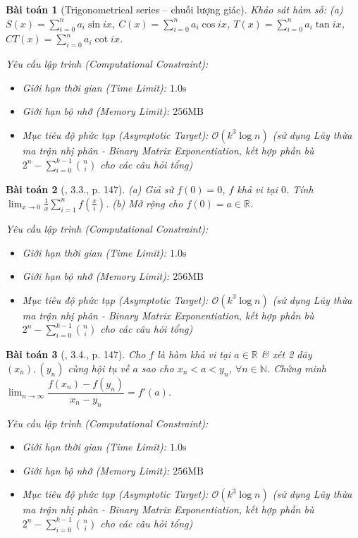 \documentclass{article}
\newtheorem{baitoan}{Bài toán}
\begin{document}
\begin{baitoan}[Trigonometrical series -- chuỗi lượng giác]
	Khảo sát hàm số: (a) $S(x) = \sum_{i=0}^n a_i\sin ix$, $C(x) = \sum_{i=0}^n a_i\cos ix$, $T(x) = \sum_{i=0}^n a_i\tan ix$, $CT(x) = \sum_{i=0}^n a_i\cot ix$.

    \vspace{0.5em}
    \emph{Yêu cầu lập trình (Computational Constraint):}
    \begin{itemize}
        \item Giới hạn thời gian (Time Limit): $1.0\mathrm{s}$
        \item Giới hạn bộ nhớ (Memory Limit): $256\mathrm{MB}$
        \item Mục tiêu độ phức tạp (Asymptotic Target): $\mathcal{O}(k^3 \log n)$ (sử dụng Lũy thừa ma trận nhị phân - Binary Matrix Exponentiation, kết hợp phần bù $2^n - \sum_{i=0}^{k-1} \binom{n}{i}$ cho các câu hỏi tổng)
    \end{itemize}
\end{baitoan}


\begin{baitoan}[\cite{Quoc_Long_Dat_Nam_VMC}, 3.3., p. 147]
	(a) Giả sử $f(0) = 0$, $f$ khả vi tại $0$. Tính $\lim_{x\to0} \frac{1}{x}\sum_{i=1}^n f\left(\frac{x}{i}\right)$. (b) Mở rộng cho $f(0) = a\in\mathbb{R}$.

    \vspace{0.5em}
    \emph{Yêu cầu lập trình (Computational Constraint):}
    \begin{itemize}
        \item Giới hạn thời gian (Time Limit): $1.0\mathrm{s}$
        \item Giới hạn bộ nhớ (Memory Limit): $256\mathrm{MB}$
        \item Mục tiêu độ phức tạp (Asymptotic Target): $\mathcal{O}(k^3 \log n)$ (sử dụng Lũy thừa ma trận nhị phân - Binary Matrix Exponentiation, kết hợp phần bù $2^n - \sum_{i=0}^{k-1} \binom{n}{i}$ cho các câu hỏi tổng)
    \end{itemize}
\end{baitoan}


\begin{baitoan}[\cite{Quoc_Long_Dat_Nam_VMC}, 3.4., p. 147]
	Cho $f$ là hàm khả vi tại $a\in\mathbb{R}$ \& xét 2 dãy $(x_n),(y_n)$ cùng hội tụ về $a$ sao cho $x_n < a < y_n$, $\forall n\in\mathbb{N}$. Chứng minh $\lim_{n\to\infty} \dfrac{f(x_n) - f(y_n)}{x_n - y_n} = f'(a)$.

    \vspace{0.5em}
    \emph{Yêu cầu lập trình (Computational Constraint):}
    \begin{itemize}
        \item Giới hạn thời gian (Time Limit): $1.0\mathrm{s}$
        \item Giới hạn bộ nhớ (Memory Limit): $256\mathrm{MB}$
        \item Mục tiêu độ phức tạp (Asymptotic Target): $\mathcal{O}(k^3 \log n)$ (sử dụng Lũy thừa ma trận nhị phân - Binary Matrix Exponentiation, kết hợp phần bù $2^n - \sum_{i=0}^{k-1} \binom{n}{i}$ cho các câu hỏi tổng)
    \end{itemize}
\end{baitoan}
\end{document}

